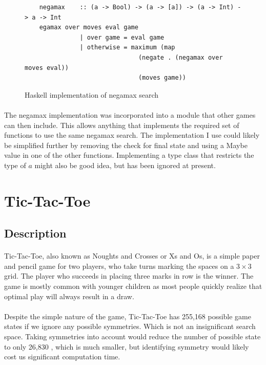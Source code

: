 \documentclass[10pt]{article}
\begin{document}
\begin{figure}[ht]
    \centering
    \begin{verbatim}
    negamax    :: (a -> Bool) -> (a -> [a]) -> (a -> Int) -> a -> Int
    egamax over moves eval game 
               | over game = eval game
               | otherwise = maximum (map 
                               (negate . (negamax over moves eval)) 
                               (moves game)) \end{verbatim}
\caption{Haskell implementation of negamax search} \label{haskellnegamax}
\end{figure}

\paragraph{} The negamax implementation was incorporated into a module that other games
    can then include. This allows anything that implements the required set of functions
    to use the same negamax search.  The implementation I use could likely be simplified 
    further by removing the check for final state and using a Maybe value in one of the 
    other functions.  Implementing a type class that restricts the type of $a$ might also
    be good idea, but has been ignored at present.

\section{Tic-Tac-Toe}
\subsection{Description}
    \paragraph{} Tic-Tac-Toe, also known as Noughts and Crosses or Xs and Os, is a 
        simple paper and pencil game for two players, who take turns marking the 
        spaces on a $3 \times 3$ grid.  The player who succeeds in placing three marks
        in row is the winner.  The game is mostly common with younger children as 
        most people quickly realize that optimal play will always result in a draw.
    \paragraph{} Despite the simple nature of the game, Tic-Tac-Toe has 255,168 possible
        game states \cite{tttnosym} if we ignore any possible symmetries.  Which is not
        an insignificant search space.  Taking symmetries into account would reduce the
        number of possible state to only 26,830 \cite{tttsym}, which is much smaller, 
        but identifying symmetry would likely cost us significant computation time.
\end{document}

